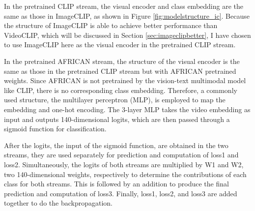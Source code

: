 In the pretrained CLIP stream, the visual encoder and class embedding are the same as those in ImageCLIP, as shown in Figure \ref{fig:modelstructure_ic}. Because the structure of ImageCLIP is able to achieve better performance than VideoCLIP, which will be discussed in Section \ref{sec:imageclipbetter}, I have chosen to use ImageCLIP here as the visual encoder in the pretrained CLIP stream. 

In the pretrained AFRICAN stream, the structure of the visual encoder is the same as those in the pretrained CLIP stream but with AFRICAN pretrained weights. Since AFRICAN is not pretrained by the vision-text multimodal model like CLIP, there is no corresponding class embedding. Therefore, a commonly used structure, the multilayer perceptron (MLP), is employed to map the embedding and one-hot encoding. The 3-layer MLP takes the video embedding as input and outputs 140-dimensional logits, which are then passed through a sigmoid function for classification.

After the logits, the input of the sigmoid function, are obtained in the two streams, they are used separately for prediction and computation of loss1 and loss2. Simultaneously, the logits of both streams are multiplied by W1 and W2, two 140-dimensional weights, respectively to determine the contributions of each class for both streams. This is followed by an addition to produce the final prediction and computation of loss3. Finally, loss1, loss2, and loss3 are added together to do the backpropagation. 
